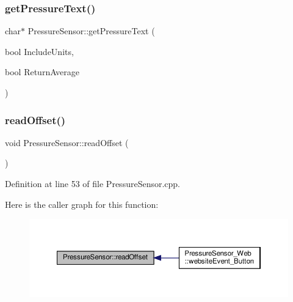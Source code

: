 \subsubsection{\texorpdfstring{get\+Pressure\+Text()}{getPressureText()}\hspace{0.1cm}{\footnotesize\ttfamily [2/2]}}
{\footnotesize\ttfamily char$\ast$ Pressure\+Sensor\+::get\+Pressure\+Text (\begin{DoxyParamCaption}\item[{bool}]{Include\+Units,  }\item[{bool}]{Return\+Average }\end{DoxyParamCaption})}

\mbox{\label{class_pressure_sensor_a9a97fa923ea86256eadff802549f0081}} 
\subsubsection{\texorpdfstring{read\+Offset()}{readOffset()}\hspace{0.1cm}{\footnotesize\ttfamily [1/2]}}
{\footnotesize\ttfamily void Pressure\+Sensor\+::read\+Offset (\begin{DoxyParamCaption}{ }\end{DoxyParamCaption})\hspace{0.3cm}{\ttfamily [protected]}}



Definition at line 53 of file Pressure\+Sensor.\+cpp.

Here is the caller graph for this function\+:
\nopagebreak
\begin{figure}[H]
\begin{center}
\leavevmode
\includegraphics[width=350pt]{class_pressure_sensor_a9a97fa923ea86256eadff802549f0081_icgraph}
\end{center}
\end{figure}
\mbox{\label{class_pressure_sensor_a9a97fa923ea86256eadff802549f0081}} 
